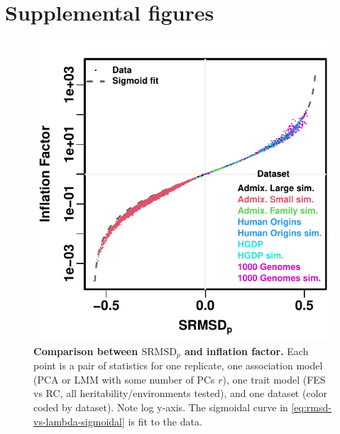 \documentclass[11pt]{article}
\newcommand{\rmsd}{\text{SRMSD}_p}
\newcommand{\beginsupplement}{%
  \setcounter{table}{0}
  \renewcommand{\thetable}{S\arabic{table}}%
  \setcounter{figure}{0}
  \renewcommand{\thefigure}{S\arabic{figure}}%
  \setcounter{section}{0}
  \renewcommand{\thesection}{S\arabic{section}}%
  \setcounter{equation}{0}
  \renewcommand{\theequation}{S\arabic{equation}}%
  \setcounter{page}{1}
  \renewcommand{\thepage}{S\arabic{page}}%
}
\begin{document}

\clearpage

\beginsupplement

\section*{Supplemental figures}

\begin{figure}[hp!]
  \centering
  \includegraphics{rmsd-vs-lambda.pdf}
  \caption{
    {\bf Comparison between $\rmsd$ and inflation factor.}
    Each point is a pair of statistics for one replicate, one association model (PCA or LMM with some number of PCs $r$), one trait model (FES vs RC, all heritability/environments tested), and one dataset (color coded by dataset).
    Note log y-axis.
    The sigmoidal curve in \cref{eq:rmsd-vs-lambda-sigmoidal} is fit to the data.
  }
  \label{fig:rmsd-vs-lambda}
\end{figure}
\end{document}
